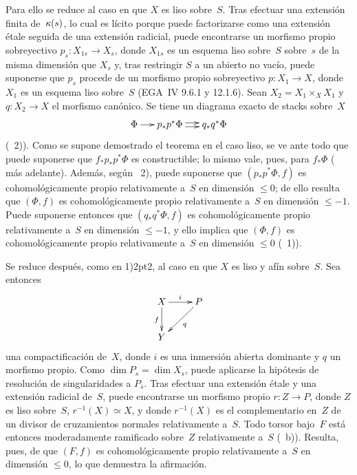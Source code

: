 Para ello se reduce al caso en que $X$ es liso sobre~$S$. Tras efectuar
una extensión finita de~$\kappa(s)$, lo cual es lícito porque puede
factorizarse como una extensión étale seguida de una extensión
radicial, puede encontrarse un morfismo propio sobreyectivo
$p_s \colon X_{1s}\to X_s$, donde $X_{1s}$ es un esquema liso
{sobre~$S$}
{sobre~$s$}
de la misma dimensión que $X_s$ y, tras restringir $S$ a un abierto no
vacío, puede suponerse que $p_s$ procede de un morfismo propio
sobreyectivo $p \colon X_1 \to X$, donde $X_1$ es un esquema liso
sobre~$S$
(EGA~IV 9.6.1 y 12.1.6). Sean $X_2=X_1 \times_X X_1$ y
$q \colon X_2 \to X$ el morfismo canónico. Se tiene un diagrama exacto
de stacks sobre~$X$
$$
\xymatrix@C=.5cm{\Phi \ar[r] & p_*p^* \Phi \ar@<2pt>[r]\ar@<-2pt>[r] &
q_*q^*\Phi }
$$
(~2)). Como se supone demostrado el teorema en el caso
liso, se ve ante todo que puede suponerse que $f_*p_*p^*\Phi$ es
constructible; lo mismo vale, pues, para $f_*\Phi$
( más adelante). Además, según
~2), puede suponerse que $(p_*p^*\Phi,f)$ es
cohomológicamente propio relativamente a~$S$ en dimensión
$\leqslant 0$; de ello resulta que $(\Phi,f)$ es cohomológicamente
propio relativamente a~$S$ en dimensión $\leqslant -1$. Puede
suponerse entonces que $(q_*q^*\Phi,f)$ es cohomológicamente propio
relativamente a~$S$ en dimensión $\leqslant -1$, y ello implica que
$(\Phi,f)$ es cohomológicamente propio relativamente a~$S$ en dimensión
$\leqslant 0$ (~1)).

Se reduce después, como en 1)\kern2pt2, al caso en que $X$ es liso y
afín sobre~$S$. Sea entonces
$$
\xymatrix{ X \ar[r]^{i} \ar[d]_{f} & P \ar[ld]^{q} \\ Y }
$$
una compactificación de~$X$, donde $i$ es una inmersión abierta
dominante y $q$ un morfismo propio. Como $\dim P_s=\dim X_s$, puede
aplicarse la hipótesis de resolución de singularidades a
$P_{\overline s}$. Tras efectuar una extensión étale y una extensión
radicial de~$S$, puede encontrarse un morfismo propio
$r \colon Z \to P$, donde $Z$ es liso sobre~$S$,
$r^{-1}(X)\simeq X$, y donde $r^{-1}(X)$ es el complementario en~$Z$
de un divisor de cruzamientos normales relativamente a~$S$. Todo
torsor bajo~$F$ está entonces moderadamente ramificado sobre~$Z$
relativamente a~$S$ (~b)). Resulta, pues, de
 que $(F,f)$ es cohomológicamente propio relativamente
a~$S$ en dimensión $\leqslant 0$, lo que demuestra la afirmación.


